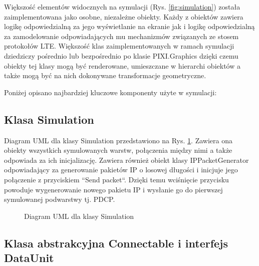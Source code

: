 Większość elementów widocznych na symulacji (Rys. \ref{fig:simulation}) została zaimplementowana jako osobne, niezależne obiekty. Każdy z obiektów zawiera logikę odpowiedzialną za jego wyświetlanie na ekranie jak i logikę odpowiedzialną za zamodelowanie odpowiadających mu mechanizmów związanych ze stosem protokołów LTE. Większość klas zaimplementowanych w ramach symulacji dziedziczy pośrednio lub bezpośrednio po klasie PIXI.Graphics dzięki czemu obiekty tej klasy mogą być renderowane, umieszczane w hierarchi obiektów a także mogą być na nich dokonywane transformacje geometryczne.

Poniżej opisano najbardziej kluczowe komponenty użyte w symulacji:

\subsection{Klasa Simulation}

Diagram UML dla klasy Simulation przedstawiono na Rys. \ref{fig:simulation_class}. Zawiera ona obiekty wszystkich symulowanych warstw, połączenia między nimi a także odpowiada za ich inicjalizację. Zawiera również obiekt klasy IPPacketGenerator odpowiadający za generowanie pakietów IP o losowej długości i inicjuje jego połączenie z przyciskiem ``Send packet``. Dzięki temu wciśnięcie przycisku powoduje wygenerowanie nowego pakietu IP i wysłanie go do pierwszej symulowanej podwarstwy tj. PDCP.

\begin{figure}[ht]
	\centerline{}
	\caption{Diagram UML dla klasy Simulation}
	\label{fig:simulation_class}
\end{figure}

\subsection{Klasa abstrakcyjna Connectable i interfejs DataUnit}

